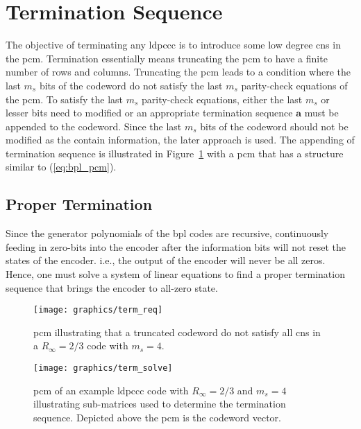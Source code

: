 \section{Termination Sequence}\label{sec:bpl_termi}
The objective of terminating any \gls{ldpccc} is to introduce some low degree \glspl{cn} in the \gls{pcm}. Termination essentially means truncating the \gls{pcm} to have a finite number of rows and columns. Truncating the \gls{pcm} leads to a condition where the last $m_s$ bits of the codeword do not satisfy the last $m_s$ parity-check equations of the \gls{pcm}. To satisfy the last $m_s$ parity-check equations, either the last $m_s$ or lesser bits need to modified or an appropriate termination sequence $\mathbf{a}$ must be appended to the codeword. Since the last $m_s$ bits of the codeword should not be modified as the contain information, the later approach is used. The appending of termination sequence is illustrated in Figure~\ref{fig:term_req} with a \gls{pcm} that has a structure similar to (\ref{eq:bpl_pcm}).

\subsection{Proper Termination}
Since the generator polynomials of the \gls{bpl} codes are recursive, continuously feeding in zero-bits into the encoder after the information bits will not reset the states of the encoder. i.e., the output of the encoder will never be all zeros. Hence, one must solve a system of linear equations to find a proper termination sequence that brings the encoder to all-zero state.

\begin{figure}[htbp]
  \centering
  \texttt{[image: graphics/term\_req]}
  \caption{\gls{pcm} illustrating that a truncated codeword do not satisfy all \glspl{cn} in a $R_\infty=2/3$ code with $m_s=4$.}
  \label{fig:term_req}
\end{figure}

\begin{figure}[htbp]
  \centering
  \texttt{[image: graphics/term\_solve]}
  \caption{\gls{pcm} of an example \gls{ldpccc} code with $R_\infty=2/3$ and $m_s=4$ illustrating sub-matrices used to determine the termination sequence. Depicted above the \gls{pcm} is the codeword vector.}
  \label{fig:bpl_term}
\end{figure}

